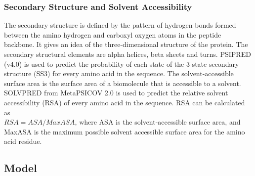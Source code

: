 \documentclass[journal=jcisd8,manuscript=article]{achemso}
\begin{document}
\subsubsection{Secondary Structure and Solvent Accessibility}
\quad The secondary structure is defined by the pattern of hydrogen bonds formed between the amino hydrogen and carboxyl oxygen atoms in the peptide backbone. It gives an idea of the three-dimensional structure of the protein. The secondary structural elements are alpha helices, beta sheets and turns. PSIPRED (v4.0) \cite{jones1999protein} is used to predict the probability of each state of the 3-state secondary structure (SS3) for every amino acid in the sequence. The solvent-accessible surface area is the surface area of a biomolecule that is accessible to a solvent. SOLVPRED from MetaPSICOV 2.0\cite{jones2015metapsicov} is used to predict the relative solvent accessibility (RSA) of every amino acid in the sequence. RSA can be calculated as \\ ${RSA} = {ASA} / {MaxASA}$, where ASA is the solvent-accessible surface area, and MaxASA is the maximum possible solvent accessible surface area for the amino acid residue.





\subsection{Model}
\end{document}
